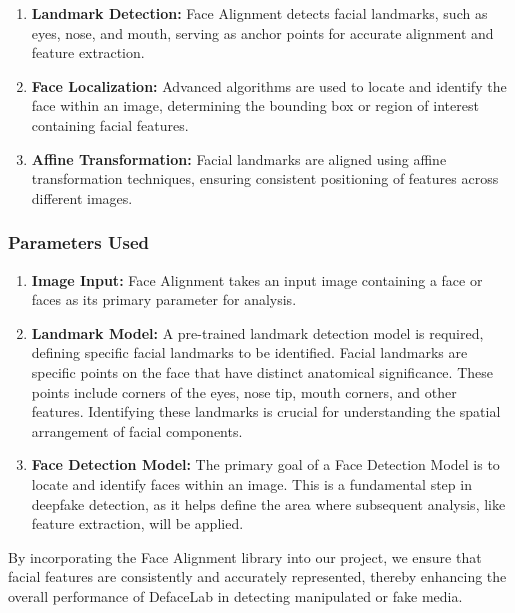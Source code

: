 \begin{enumerate}
    \item \textbf{Landmark Detection:} Face Alignment detects facial landmarks, such as eyes, nose, and mouth, serving as anchor points for accurate alignment and feature extraction.
    
    \item \textbf{Face Localization:} Advanced algorithms are used to locate and identify the face within an image, determining the bounding box or region of interest containing facial features.
    
    \item \textbf{Affine Transformation:} Facial landmarks are aligned using affine transformation techniques, ensuring consistent positioning of features across different images.
\end{enumerate}

\subsubsection{Parameters Used}

\begin{enumerate}
    \item \textbf{Image Input:} Face Alignment takes an input image containing a face or faces as its primary parameter for analysis.
    
    \item \textbf{Landmark Model:} A pre-trained landmark detection model is required, defining specific facial landmarks to be identified.  Facial landmarks are specific points on the face that have distinct anatomical significance. These points include corners of the eyes, nose tip, mouth corners, and other features. Identifying these landmarks is crucial for understanding the spatial arrangement of facial components.
    
    \item \textbf{Face Detection Model:} The primary goal of a Face Detection Model is to locate and identify faces within an image. This is a fundamental step in deepfake detection, as it helps define the area where subsequent analysis, like feature extraction, will be applied.
\end{enumerate}

By incorporating the Face Alignment library into our project, we ensure that facial features are consistently and accurately represented, thereby enhancing the overall performance of DefaceLab in detecting manipulated or fake media.

\newpage